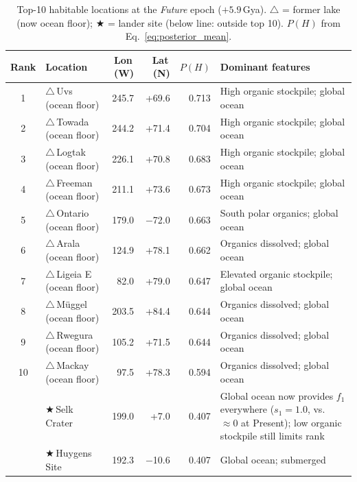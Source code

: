 \begin{table}[H]
\centering
\small
\begin{tabular}{clrrrp{4.5cm}}
\toprule
\textbf{Rank} & \textbf{Location} & \textbf{Lon\,(\textdegree{}W)} & \textbf{Lat\,(\textdegree{}N)} & \textbf{$P(H)$} & \textbf{Dominant features} \\
\midrule
1  & $\triangle$\,Uvs (ocean floor)      & 245.7 & +69.6 & 0.713 & High organic stockpile; global ocean \\
2  & $\triangle$\,Towada (ocean floor)   & 244.2 & +71.4 & 0.704 & High organic stockpile; global ocean \\
3  & $\triangle$\,Logtak (ocean floor)   & 226.1 & +70.8 & 0.683 & High organic stockpile; global ocean \\
4  & $\triangle$\,Freeman (ocean floor)  & 211.1 & +73.6 & 0.673 & High organic stockpile; global ocean \\
5  & $\triangle$\,Ontario (ocean floor)  & 179.0 & $-$72.0 & 0.663 & South polar organics; global ocean \\
6  & $\triangle$\,Arala (ocean floor)    & 124.9 & +78.1 & 0.662 & Organics dissolved; global ocean \\
7  & $\triangle$\,Ligeia E (ocean floor) &  82.0 & +79.0 & 0.647 & Elevated organic stockpile; global ocean \\
8  & $\triangle$\,Müggel (ocean floor)   & 203.5 & +84.4 & 0.644 & Organics dissolved; global ocean \\
9  & $\triangle$\,Rwegura (ocean floor)  & 105.2 & +71.5 & 0.644 & Organics dissolved; global ocean \\
10 & $\triangle$\,Mackay (ocean floor)   &  97.5 & +78.3 & 0.594 & Organics dissolved; global ocean \\
\midrule
 & $\bigstar$\,Selk Crater  & 199.0 & +7.0  & 0.407 & Global ocean now provides $f_1$ everywhere ($s_1{=}1.0$, vs.\ ${\approx}0$ at Present); low organic stockpile still limits rank \\
 & $\bigstar$\,Huygens Site & 192.3 & $-$10.6 & 0.407 & Global ocean; submerged \\
\bottomrule
\end{tabular}
\caption{Top-10 habitable locations at the \textit{Future} epoch ($+5.9$\,Gya).
  $\triangle$ = former lake (now ocean floor); $\bigstar$ = lander site
  (below line: outside top 10).
  $P(H)$ from Eq.~\ref{eq:posterior_mean}.}
\label{tab:top10_future}
\end{table}